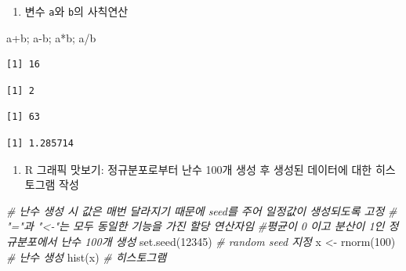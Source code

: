 \documentclass[
  11pt,
]{krantz}
\newenvironment{Shaded}{\begin{snugshade}}{\end{snugshade}}
\newcommand{\CommentTok}[1]{\textcolor[rgb]{0.37,0.37,0.37}{\textit{#1}}}
\newcommand{\DecValTok}[1]{\textcolor[rgb]{0.06,0.06,0.06}{#1}}
\newcommand{\FunctionTok}[1]{\textcolor[rgb]{0,0,0}{#1}}
\newcommand{\NormalTok}[1]{#1}
\newcommand{\OtherTok}[1]{\textcolor[rgb]{0.37,0.37,0.37}{#1}}
\newcommand{\SpecialCharTok}[1]{\textcolor[rgb]{0,0,0}{#1}}
\providecommand{\tightlist}{%
  \setlength{\itemsep}{0pt}\setlength{\parskip}{0pt}}
\begin{document}
\normalsize

\begin{enumerate}
\def\labelenumi{\arabic{enumi}.}
\setcounter{enumi}{3}
\tightlist
\item
  변수 \texttt{a}와 \texttt{b}의 사칙연산
\end{enumerate}

\footnotesize

\begin{Shaded}
\begin{Highlighting}[]
\NormalTok{a}\SpecialCharTok{+}\NormalTok{b; a}\SpecialCharTok{{-}}\NormalTok{b; a}\SpecialCharTok{*}\NormalTok{b; a}\SpecialCharTok{/}\NormalTok{b}
\end{Highlighting}
\end{Shaded}

\begin{verbatim}
[1] 16
\end{verbatim}

\begin{verbatim}
[1] 2
\end{verbatim}

\begin{verbatim}
[1] 63
\end{verbatim}

\begin{verbatim}
[1] 1.285714
\end{verbatim}

\normalsize

\begin{enumerate}
\def\labelenumi{\arabic{enumi}.}
\setcounter{enumi}{4}
\tightlist
\item
  R 그래픽 맛보기: 정규분포로부터 난수 100개 생성 후 생성된 데이터에 대한 히스토그램 작성
\end{enumerate}

\footnotesize

\begin{Shaded}
\begin{Highlighting}[]
\CommentTok{\# 난수 생성 시 값은 매번 달라지기 때문에 seed를 주어 일정값이 생성되도록 고정}
\CommentTok{\# "="과 "\textless{}{-}"는 모두 동일한 기능을 가진 할당 연산자임}
\CommentTok{\#평균이 0 이고 분산이 1인 정규분포에서 난수 100개 생성}
\FunctionTok{set.seed}\NormalTok{(}\DecValTok{12345}\NormalTok{) }\CommentTok{\# random seed 지정}
\NormalTok{x }\OtherTok{\textless{}{-}} \FunctionTok{rnorm}\NormalTok{(}\DecValTok{100}\NormalTok{) }\CommentTok{\# 난수 생성}
\FunctionTok{hist}\NormalTok{(x) }\CommentTok{\# 히스토그램}
\end{Highlighting}
\end{Shaded}
\end{document}
